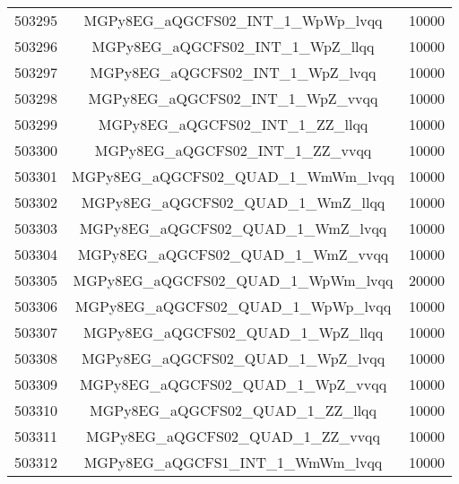 \begin{table}[!htbp]
\begin{center}
\begin{tabular}{c|c|c}
503295 & MGPy8EG\_aQGCFS02\_INT\_1\_WpWp\_lvqq   & 10000 \\
503296 & MGPy8EG\_aQGCFS02\_INT\_1\_WpZ\_llqq    & 10000 \\
503297 & MGPy8EG\_aQGCFS02\_INT\_1\_WpZ\_lvqq    & 10000 \\
503298 & MGPy8EG\_aQGCFS02\_INT\_1\_WpZ\_vvqq    & 10000 \\
503299 & MGPy8EG\_aQGCFS02\_INT\_1\_ZZ\_llqq     & 10000 \\
503300 & MGPy8EG\_aQGCFS02\_INT\_1\_ZZ\_vvqq     & 10000 \\
503301 & MGPy8EG\_aQGCFS02\_QUAD\_1\_WmWm\_lvqq  & 10000 \\
503302 & MGPy8EG\_aQGCFS02\_QUAD\_1\_WmZ\_llqq   & 10000 \\
503303 & MGPy8EG\_aQGCFS02\_QUAD\_1\_WmZ\_lvqq   & 10000 \\
503304 & MGPy8EG\_aQGCFS02\_QUAD\_1\_WmZ\_vvqq   & 10000 \\
503305 & MGPy8EG\_aQGCFS02\_QUAD\_1\_WpWm\_lvqq  & 20000 \\
503306 & MGPy8EG\_aQGCFS02\_QUAD\_1\_WpWp\_lvqq  & 10000 \\
503307 & MGPy8EG\_aQGCFS02\_QUAD\_1\_WpZ\_llqq   & 10000 \\
503308 & MGPy8EG\_aQGCFS02\_QUAD\_1\_WpZ\_lvqq   & 10000 \\
503309 & MGPy8EG\_aQGCFS02\_QUAD\_1\_WpZ\_vvqq   & 10000 \\
503310 & MGPy8EG\_aQGCFS02\_QUAD\_1\_ZZ\_llqq    & 10000 \\
503311 & MGPy8EG\_aQGCFS02\_QUAD\_1\_ZZ\_vvqq    & 10000 \\
503312 & MGPy8EG\_aQGCFS1\_INT\_1\_WmWm\_lvqq    & 10000 \\


\hline
\end{tabular}
\label{tabular:mc_samples_aqgc_4}
\end{center}
\end{table}


